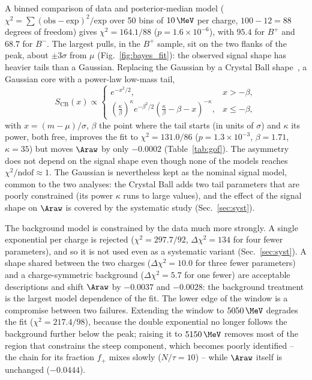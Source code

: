 A binned comparison of data and posterior-median model ($\chi^2=\sum(\text{obs}-\text{exp})^2/\text{exp}$ over 50 bins of $10\,\MeV$ per charge, $100-12=88$ degrees of freedom) gives $\chi^2=164.1/88$ ($p=1.6\times10^{-6}$), with $95.4$ for $B^+$ and $68.7$ for $B^-$. The largest pulls, in the $B^+$ sample, sit on the two flanks of the peak, about $\pm3\sigma$ from $\mu$ (Fig.~\ref{fig:bayes_fit}): the observed signal shape has heavier tails than a Gaussian. Replacing the Gaussian by a Crystal Ball shape~\cite{skwarnicki}, a Gaussian core with a power-law low-mass tail,
\begin{equation}
S_{\mathrm{CB}}(x)\propto
\begin{cases}
e^{-x^2/2}, & x>-\beta,\\[2pt]
\left(\frac{\kappa}{\beta}\right)^{\kappa} e^{-\beta^2/2}\left(\frac{\kappa}{\beta}-\beta-x\right)^{-\kappa}, & x\leq-\beta,
\end{cases}
\label{eq:cb}
\end{equation}
with $x=(m-\mu)/\sigma$, $\beta$ the point where the tail starts (in units of $\sigma$) and $\kappa$ its power, both free, improves the fit to $\chi^2=131.0/86$ ($p=1.3\times10^{-3}$, $\beta=1.71$, $\kappa=35$) but moves $\Araw$ by only $-0.0002$ (Table~\ref{tab:gof}). The asymmetry does not depend on the signal shape even though none of the models reaches $\chi^2/\text{ndof}\approx1$. The Gaussian is nevertheless kept as the nominal signal model, common to the two analyses: the Crystal Ball adds two tail parameters that are poorly constrained (its power $\kappa$ runs to large values), and the effect of the signal shape on $\Araw$ is covered by the systematic study (Sec.~\ref{sec:syst}).

The background model is constrained by the data much more strongly. A single exponential per charge is rejected ($\chi^2=297.7/92$, $\Delta\chi^2=134$ for four fewer parameters), and so it is not used even as a systematic variant (Sec.~\ref{sec:syst}). A shape shared between the two charges ($\Delta\chi^2=10.0$ for three fewer parameters) and a charge-symmetric background ($\Delta\chi^2=5.7$ for one fewer) are acceptable descriptions and shift $\Araw$ by $-0.0037$ and $-0.0028$: the background treatment is the largest model dependence of the fit. The lower edge of the window is a compromise between two failures. Extending the window to $5050\,\MeV$ degrades the fit ($\chi^2=217.4/98$), because the double exponential no longer follows the background further below the peak; raising it to $5150\,\MeV$ removes most of the region that constrains the steep component, which becomes poorly identified -- the chain for its fraction $f_+$ mixes slowly ($N/\tau=10$) -- while $\Araw$ itself is unchanged ($-0.0444$).

